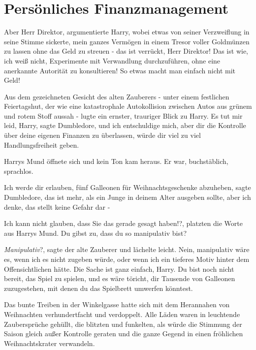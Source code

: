 \chapter{Persönliches Finanzmanagement}

\glqq{}Aber Herr Direktor\grqq{}, argumentierte Harry, wobei etwas von seiner
Verzweiflung in seine Stimme sickerte, \glqq{}mein ganzes Vermögen in einem
Tresor voller Goldmünzen zu lassen ohne das Geld zu streuen - das ist verrückt,
Herr Direktor! Das ist wie, ich weiß nicht, Experimente mit Verwandlung
durchzuführen, ohne eine anerkannte Autorität zu konsultieren! So etwas macht
man einfach nicht mit Geld!\grqq{}

Aus dem gezeichneten Gesicht des alten Zauberers - unter einem festlichen
Feiertagshut, der wie eine katastrophale Autokollision zwischen Autos aus grünem
und rotem Stoff aussah - lugte ein ernster, trauriger Blick zu Harry. \glqq{}Es
tut mir leid, Harry\grqq{}, sagte Dumbledore, \glqq{}und ich entschuldige mich,
aber dir die Kontrolle über deine eigenen Finanzen zu überlassen, würde dir viel
zu viel Handlungsfreiheit geben.\grqq{}

Harrys Mund öffnete sich und kein Ton kam heraus. Er war, buchstäblich,
sprachlos.

\glqq{}Ich werde dir erlauben, fünf Galleonen für Weihnachtsgeschenke
abzuheben\grqq{}, sagte Dumbledore, \glqq{}das ist mehr, als ein Junge in deinem
Alter ausgeben sollte, aber ich denke, das stellt keine Gefahr dar -\grqq{}

\glqq{}Ich kann nicht glauben, dass Sie das gerade gesagt haben!?\grqq{},
platzten die Worte aus Harrys Mund. \glqq{}Du gibst zu, dass du so manipulativ
bist?\grqq{}

\glqq{}\emph{Manipulativ}?\grqq{}, sagte der alte Zauberer und lächelte leicht.
\glqq{}Nein, manipulativ wäre es, wenn ich es nicht zugeben würde, oder wenn ich
ein tieferes Motiv hinter dem Offensichtlichen hätte. Die Sache ist ganz
einfach, Harry. Du bist noch nicht bereit, das Spiel zu spielen, und es wäre
töricht, dir Tausende von Galleonen zuzugestehen, mit denen du das Spielbrett
umwerfen könntest.\grqq{}

Das bunte Treiben in der Winkelgasse hatte sich mit dem Herannahen von
Weihnachten verhundertfacht und verdoppelt. Alle Läden waren in leuchtende
Zaubersprüche gehüllt, die blitzten und funkelten, als würde die Stimmung der
Saison gleich außer Kontrolle geraten und die ganze Gegend in einen fröhlichen
Weihnachtskrater verwandeln.

